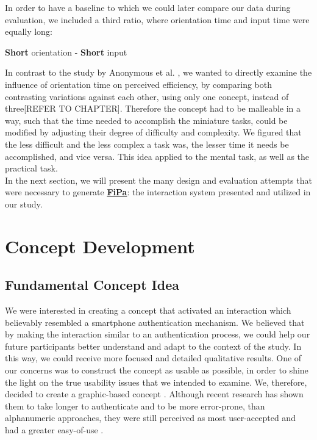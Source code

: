 In order to have  a baseline to which we could later compare our data during evaluation, we included a third ratio, where orientation time and input time were equally long:  
\begin{center}
\textbf{Short} orientation - \textbf{Short} input
\end{center} 

In contrast to the study by Anonymous et al. \cite{anonymous}, we wanted to directly examine the influence of orientation time on perceived efficiency, by comparing both contrasting variations against each other, using only one concept, instead of three[REFER TO CHAPTER]. Therefore the concept had to be malleable in a way, such that the time needed to accomplish the miniature tasks, could be modified by adjusting their degree of difficulty and complexity. We figured that the less difficult and the less complex a task was, the lesser time it needs be accomplished, and vice versa. This idea applied to the mental task, as well as the practical task. \\
In the next section, we will present the many design and evaluation attempts that were necessary to generate \underline{\textbf{FiPa}}: the interaction system presented and utilized in our study. 

\section{Concept Development}

\subsection{Fundamental Concept Idea}
We were interested in creating a concept that activated an interaction which believably resembled a smartphone authentication mechanism. We believed that by making the interaction similar to an authentication process, we could help our future participants better understand and adapt to the context of the study. In this way, we could receive more focused and detailed qualitative results. One of our concerns was to construct the concept as usable as possible, in order to shine the light on the true usability issues that we intended to examine. We, therefore, decided to create a graphic-based concept \cite{AnatomySmartphone}. Although recent research has shown them to take longer to authenticate and to be more error-prone, than alphanumeric approaches, they were still perceived as most user-accepted and had a greater easy-of-use \cite{PatternWild}.\\

